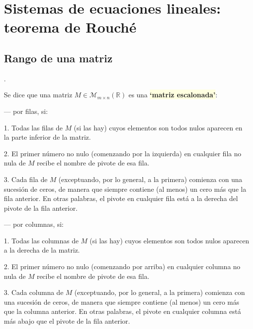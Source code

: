 
\chapter{Sistemas de ecuaciones lineales: teorema de Rouché}	
	\label{SEL}

	
\section{Rango de una matriz}\label{rangos}

\begin{defi}.



Se dice que una matriz $M\in \mathcal M_{m \times n}(\mathbb R)$ es una \colorbox{LightYellow}{\textbf{`matriz escalonada'}}:

\noindent  --- por filas, si:

\hspace{3mm} 1.	Todas las filas de $M$ (si las hay) cuyos elementos son todos nulos aparecen en la parte inferior de la matriz. 

\hspace{3mm} 2.	El primer número no nulo (comenzando por la izquierda) en cualquier fila no nula de $M$ recibe el nombre de pivote de esa fila. 

\hspace{3mm} 3.	Cada fila de $M$ (exceptuando, por lo general, a la primera) comienza con una sucesión de ceros, de manera que siempre contiene (al menos) un cero más que la fila anterior. En otras palabras, el pivote en cualquier fila está a la derecha del pivote de la fila anterior. 

\noindent  --- por columnas, si:

\hspace{3mm} 1.	Todas las columnas de $M$ (si las hay) cuyos elementos son todos nulos aparecen a la derecha de la matriz. 

\hspace{3mm} 2.	El primer número no nulo (comenzando por arriba) en cualquier columna no nula de $M$ recibe el nombre de pivote de esa fila. 

\hspace{3mm} 3.	Cada columna de $M$ (exceptuando, por lo general, a la primera) comienza con una sucesión de ceros, de manera que siempre contiene (al menos) un cero más que la columna anterior. En otras palabras, el pivote en cualquier columna está más abajo que el pivote de la fila anterior. 
\end{defi}


